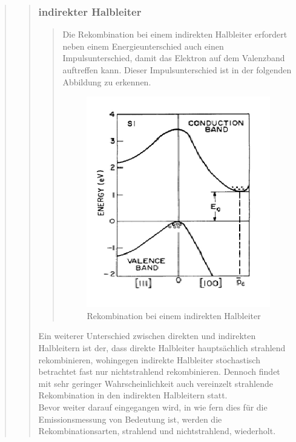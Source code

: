\begin{quote}
\begin{quote}
            \subsubsection{indirekter Halbleiter}
            \begin{quote}
            Die Rekombination bei einem indirekten Halbleiter erfordert neben
            einem Energieunterschied auch einen Impulsunterschied, damit das
            Elektron auf dem Valenzband auftreffen kann. Dieser
            Impulsunterschied ist in der folgenden Abbildung zu erkennen.

            \begin{figure}[H]
                    \centering
                        \includegraphics[scale=0.73, trim = 1cm 0cm 1.5cm 0cm,
                        clip]{./Emissionsbilder/restliches/indirekt.png}
                        \caption{Rekombination bei einem indirekten Halbleiter}
                            \label{fig:./Emissionsbilder/restliches/indirekt.png}
            \end{figure}

            \end{quote}

            Ein weiterer Unterschied zwischen direkten und indirekten
            Halbleitern ist der, dass direkte Halbleiter hauptsächlich
            strahlend rekombinieren, wohingegen indirekte Halbleiter
            stochastisch betrachtet fast nur nichtstrahlend rekombinieren.
            Dennoch findet mit sehr geringer Wahrscheinlichkeit auch vereinzelt
            strahlende Rekombination in den indirekten Halbleitern statt.\\
            Bevor weiter darauf eingegangen wird, in wie fern dies für die
            Emissionsmessung von Bedeutung ist, werden die Rekombinationsarten,
            strahlend und nichtstrahlend, wiederholt.


\end{quote}
\end{quote}
